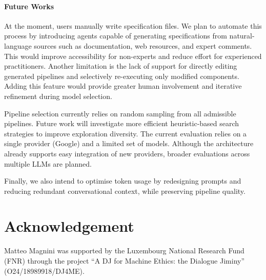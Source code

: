 \documentclass[runningheads]{llncs}
\begin{document}
\paragraph{Future Works}

At the moment, users manually write specification files.
%
We plan to automate this process by introducing agents capable of generating specifications from natural-language sources such as documentation, web resources, and expert comments.
%
This would improve accessibility for non-experts and reduce effort for experienced practitioners.
Another limitation is the lack of support for directly editing generated pipelines and selectively re-executing only modified components.
%
Adding this feature would provide greater human involvement and iterative refinement during model selection.

Pipeline selection currently relies on random sampling from all admissible pipelines.
%
Future work will investigate more efficient heuristic-based search strategies to improve exploration diversity.
%
The current evaluation relies on a single provider (Google) and a limited set of models.
%
Although the architecture already supports easy integration of new providers, broader evaluations across multiple \acp{LLM} are planned.

Finally, we also intend to optimise token usage by redesigning prompts and reducing redundant conversational context, while preserving pipeline quality.



\section*{Acknowledgement}

Matteo Magnini was supported by the Luxembourg National Research Fund (FNR)
through the project ``A DJ for Machine Ethics: the Dialogue Jiminy'' (O24/18989918/DJ4ME).




\end{document}
